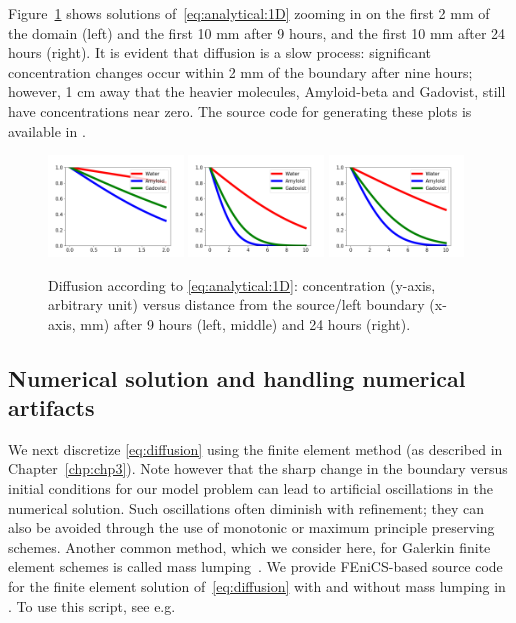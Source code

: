 Figure~\ref{fig:chp6:analytics} shows solutions
of~\eqref{eq:analytical:1D} zooming in on the first 2 mm of the domain
(left) and the first 10 mm after 9 hours, and the first 10 mm after 24
hours (right). It is evident that diffusion is a slow process:
significant concentration changes occur within 2 mm of the boundary
after nine hours; however, 1 cm away that the heavier molecules,
Amyloid-beta and Gadovist, still have concentrations near zero. The
source code for generating these plots is available in
.
\begin{figure}	
  \includegraphics[width=0.32\textwidth]{./chapters/chp6/FIG/9hours_2mm_WAG}
  \includegraphics[width=0.32\textwidth]{./chapters/chp6/FIG/9hours_1cm_WAG}
  \includegraphics[width=0.32\textwidth]{./chapters/chp6/FIG/24hours_1cm_WAG}
  \caption{Diffusion according to \eqref{eq:analytical:1D}:
    concentration (y-axis, arbitrary unit) versus distance from the
    source/left boundary (x-axis, mm) after 9 hours (left, middle) and
    24 hours (right).}
  \label{fig:chp6:analytics}
\end{figure}

\subsection{Numerical solution and handling numerical artifacts}

We next discretize \eqref{eq:diffusion} using the finite element
method (as described in Chapter~\ref{chp:chp3}). Note however that the
sharp change in the boundary versus initial conditions for our model
problem can lead to artificial oscillations in the numerical
solution. Such oscillations often diminish with refinement; they can
also be avoided through the use of monotonic or maximum principle
preserving schemes. Another common method, which we consider here, for
Galerkin finite element schemes is called mass lumping~\cite{}. We
provide FEniCS-based source code for the finite element solution
of~\eqref{eq:diffusion} with and without mass lumping in
. To use this script, see e.g.


